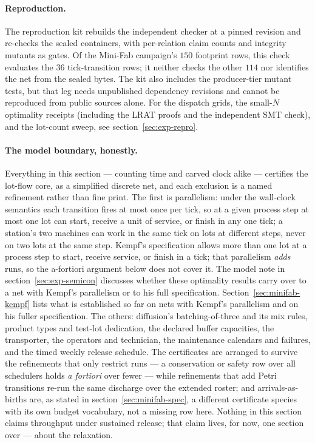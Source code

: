 \paragraph{Reproduction.} The reproduction kit rebuilds the independent checker at a pinned
revision and re-checks the sealed containers, with per-relation
claim counts and integrity mutants as gates. Of the Mini-Fab
campaign's $150$ footprint rows, this check evaluates the $36$
tick-transition rows; it neither checks the other $114$ nor
identifies the net from the sealed bytes. The kit also includes
the producer-tier mutant tests, but that leg needs unpublished
dependency revisions and cannot be reproduced from public sources
alone. For the dispatch grids, the small-$N$ optimality receipts
(including the LRAT proofs and the independent SMT check), and
the lot-count sweep, see section~\ref{sec:exp-repro}.

\paragraph{The model boundary, honestly.}\label{par:minifab-model-boundary} Everything in this
section --- counting time and carved clock alike --- certifies
the lot-flow core, as a simplified discrete net, and each exclusion
is a named refinement rather than fine print. The first is
parallelism: under the wall-clock semantics each transition fires at
most once per tick, so at a given process step at most one lot can
start, receive a unit of service, or finish in any one tick; a
station's two machines can work in the same tick on lots at
different steps, never on two lots at the same step. Kempf's
specification allows more than one lot at a process step to start,
receive service, or finish in a tick; that parallelism \emph{adds}
runs, so the a-fortiori argument below does not cover it. The model
note in section~\ref{sec:exp-semicon} discusses whether these
optimality results carry over to a net with Kempf's parallelism or
to his full specification.
Section~\ref{sec:minifab-kempf} lists what is established so far
on nets with Kempf's parallelism and on his fuller specification.
The others: diffusion's batching-of-three and its mix rules,
product types and test-lot dedication, the declared buffer
capacities, the transporter, the operators and technician, the
maintenance calendars and failures, and the timed weekly release
schedule. The certificates are arranged to survive the refinements
that only restrict runs --- a conservation or safety row over all
schedulers holds \emph{a fortiori} over fewer --- while refinements
that add Petri transitions re-run the same discharge over the
extended roster; and arrivals-as-births are, as stated in
section~\ref{sec:minifab-spec}, a different certificate species
with its own budget vocabulary, not a missing row here. Nothing in
this section claims throughput under sustained release; that claim
lives, for now, one section over --- about the relaxation.

